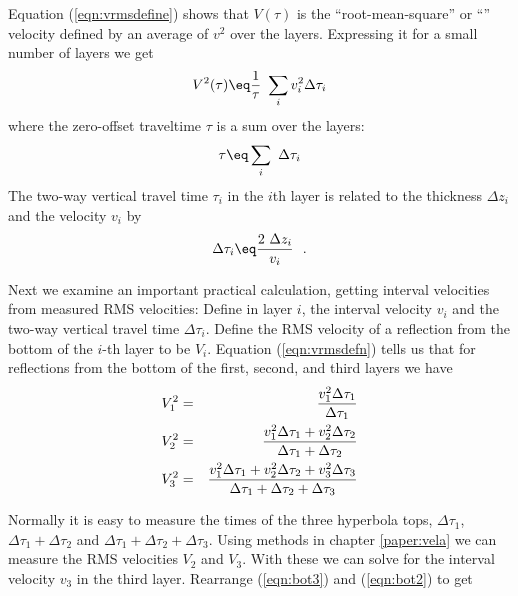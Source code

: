 \par
Equation (\ref{eqn:vrmsdefine}) shows that
$V(\tau)$
is
the ``root-mean-square'' or
``\RMS'' velocity defined by
an average of $v^2$ over the layers.
Expressing it for a small number of layers we get
\begin{equation}
V^2(\tau) \eq \frac{1}{\tau}\  \sum_i v^2_i \Delta\tau_i
\label{eqn:vrmsdefn}
\end{equation}
where the zero-offset traveltime $\tau$ is a sum over the layers:
\begin{equation}
\tau \eq \sum_i \ \Delta\tau_i
\label{eqn:onetaudefn}
\end{equation}
The two-way vertical travel time $\tau_i$
in the $i$th layer is related to the
thickness $\Delta z_i$ and the velocity $v_i$  by
\begin{equation}
\Delta\tau_i \eq  \frac{2\ \Delta z_i}{v_i}  \ \ .
\label{eqn:twotaudefn}
\end{equation}
\par
Next we examine an important practical calculation,
getting interval velocities from measured RMS velocities:
Define
in layer $i$,
the interval velocity $v_i$
and the two-way vertical travel time $\Delta\tau_i$.
Define the RMS velocity
of a reflection
from the bottom of the $i$-th layer
to be $V_i$.
Equation (\ref{eqn:vrmsdefn}) tells us that for
reflections from the bottom of the first, second, and third layers we have
\begin{eqnarray}
V_1^2 &=& {v_1^2\Delta\tau_1           
                               \over \Delta\tau_1                 }
\\
\label{eqn:bot2}
V_2^2 &=& {v_1^2\Delta\tau_1+ v_2^2\Delta\tau_2 
                               \over \Delta\tau_1 + \Delta\tau_2        }
\\
\label{eqn:bot3}
V_3^2 &=& {v_1^2\Delta\tau_1+ v_2^2\Delta\tau_2 +v_3^2\Delta\tau_3  
                               \over \Delta\tau_1 + \Delta\tau_2 +\Delta\tau_3}
\end{eqnarray}

Normally it is easy to measure the times of the three hyperbola tops,
$\Delta\tau_1$, 
$\Delta\tau_1 + \Delta\tau_2$
and
$\Delta\tau_1 + \Delta\tau_2 +\Delta\tau_3$.
Using methods in chapter \ref{paper:vela}
we can measure the RMS velocities $V_2$ and $V_3$.
With these we can solve for the interval velocity $v_3$ in the third layer.
Rearrange (\ref{eqn:bot3}) and (\ref{eqn:bot2}) to get

